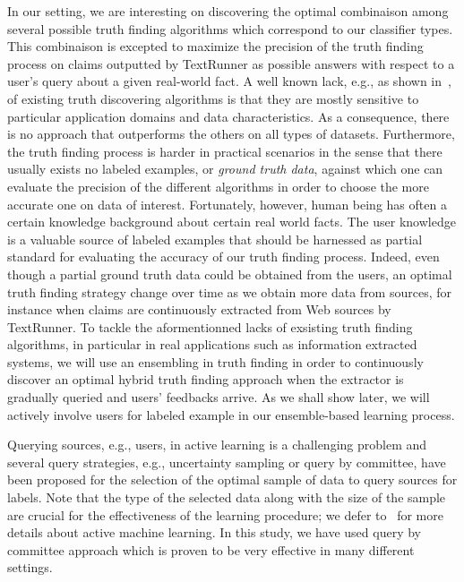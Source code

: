 In our setting, we are interesting on discovering the optimal combinaison among several possible truth finding algorithms
which correspond to our classifier types.
This combinaison is excepted to maximize the precision of the truth finding process on claims outputted by TextRunner as 
possible answers with respect to a user's query about a given real-world fact.
A well known lack, e.g., as shown in~\cite{Li12, Wagui14}, of existing truth discovering algorithms is that they are mostly sensitive
to particular application domains and data characteristics. As a consequence, there is no approach that outperforms the others on all 
types of datasets. Furthermore, the truth finding process is harder in practical scenarios in the sense that there usually exists
no labeled examples, or \emph{ground truth data}, against which one can evaluate the precision of the different algorithms in order to choose
the more accurate one on data of interest.  Fortunately, however, human being has often a certain knowledge background about certain real world facts.
The user knowledge is a valuable source of labeled examples that should be harnessed as partial standard for evaluating the accuracy of our truth finding 
process. Indeed, even though a partial ground truth data could be obtained from the users, an optimal truth finding strategy change over time as we obtain
more data from sources, for instance when claims are continuously extracted from Web sources by TextRunner.
To tackle the aformentionned lacks of exsisting truth finding algorithms, in particular in real applications such as information extracted systems, 
we will use an ensembling in truth finding in order to continuously discover an optimal hybrid truth finding approach when the extractor is gradually
queried and users' feedbacks arrive. As we shall show later, we will actively involve users for labeled example in our ensemble-based learning process.

Querying sources, e.g., users, in active learning is a challenging problem and several query strategies, e.g., uncertainty sampling or query by committee, 
have been proposed for the selection of the optimal sample of data to query sources for labels. Note that the type of the selected data along with the size
of the sample are crucial for the effectiveness of the learning procedure; we defer to~\cite{burr12} for more details about active machine learning. 
In this study, we have used query by committee approach which is proven to be very effective in many different settings.



